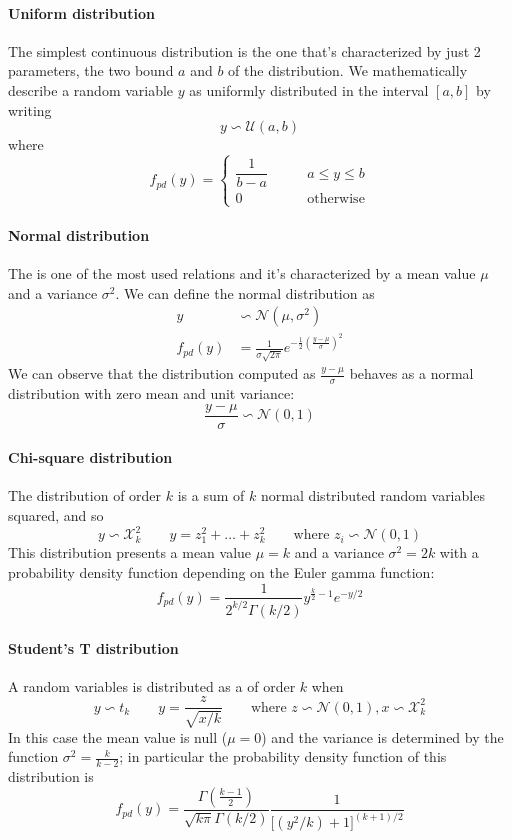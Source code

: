 	\paragraph{Uniform distribution} The simplest continuous distribution is the  one that's characterized by just 2 parameters, the two bound $a$ and $b$ of the distribution. We mathematically describe a random variable $y$ as uniformly distributed in the interval $[a,b]$ by writing
	\[ y \backsim \mathcal U(a,b) \]
	where
	\begin{equation}
		f_{pd}(y) = \begin{cases}
			\dfrac{1}{b-a} \qquad& a \leq y \leq b \\0 & \textrm{otherwise}
		\end{cases}
	\end{equation}
	
	\paragraph{Normal distribution} The  is one of the most used relations and it's characterized by a mean value $\mu$ and a variance $\sigma^2$. We can define the normal distribution as
	\begin{equation}
	\begin{aligned}
		y &\backsim \mathcal N(\mu,\sigma^2) \\
		f_{pd}(y) &= \frac 1 {\sigma \sqrt{2\pi}} e ^{-\frac 1 2 \left(\frac{y-\mu}{\sigma}\right)^2}
	\end{aligned}
	\end{equation}
	We can observe that the distribution computed as $\frac{y-\mu}{\sigma}$ behaves as a normal distribution with zero mean and unit variance:
	\[ \frac{y-\mu}{\sigma} \backsim \mathcal N(0,1) \]
	
	\paragraph{Chi-square distribution} The  distribution of order $k$ is a sum of $k$ normal distributed random variables squared, and so
	\[ y \backsim \mathcal X_k^2 \qquad y = z_1^2+\dots+z_k^2 \qquad \textrm{where } z_i \backsim \mathcal N(0,1) \]
	This distribution presents a mean value $\mu = k$ and a variance $\sigma^2  = 2k$ with a probability density function depending on the Euler gamma function:
	\[ f_{pd}(y) = \frac{1}{2^{k/2} \Gamma(k/2) } y^{\frac k 2 - 1} e^{-y/2} \]
	
	\paragraph{Student's T distribution} A random variables is distributed as a  of order $k$ when
	\[ y\backsim t_k \qquad y = \frac{z}{\sqrt{x/k}} \qquad \textrm{where }  z\backsim \mathcal N(0,1), x \backsim \mathcal X_k^2 \]
	In this case the mean value is null ($\mu = 0 $) and the variance is determined by the function $\sigma^2= \frac{k}{k-2}$; in particular the probability density function of this distribution is
	\[ f_{pd} (y) = \frac{\Gamma \left( \frac{k-1}2 \right)}{\sqrt{k\pi} \Gamma(k/2)} \frac{1}{\big[ (y^2/k) + 1  \big]^{(k+1)/2}} \]
	
